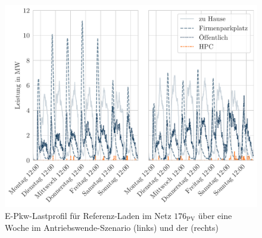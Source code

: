 \begin{figure}[H]
    \centering
    \includegraphics[width=\textwidth]{Bilder/example_load_profile}
    \caption[E-Pkw-Lastprofil für Referenz-Laden im Netz \num{176} über eine Woche im Antriebswende-Szenario und der \SzeFirmenparkplatz]{E-Pkw-Lastprofil für Referenz-Laden im Netz \(176_{\text{PV}}\) über eine Woche im Antriebswende-Szenario (links) und der \SzeFirmenparkplatz (rechts)}\label{fig:example_load_profile}
\end{figure}